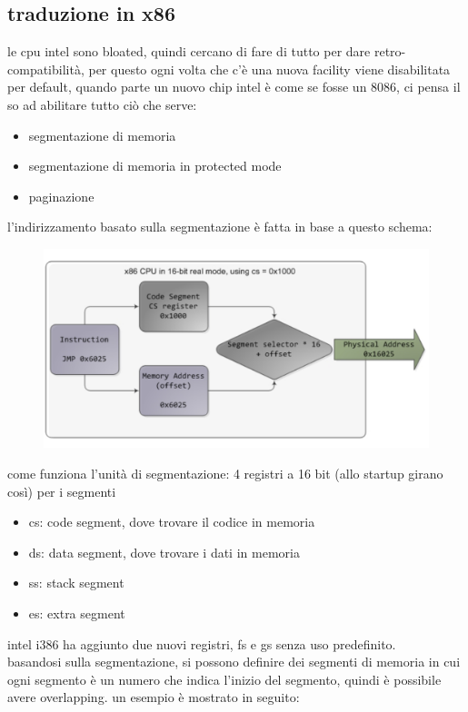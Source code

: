 \documentclass[12pt, oneside]{extbook} %
\begin{document}
\subsection{traduzione in x86}
le cpu intel sono bloated, quindi cercano di fare di tutto per dare retro-compatibilità, per questo ogni volta che c'è una nuova facility viene disabilitata per default, quando parte un nuovo chip intel è come se fosse un 8086, ci pensa il so ad abilitare tutto ciò che serve:
\begin{itemize}
\item segmentazione di memoria
\item segmentazione di memoria in protected mode
\item paginazione
\end{itemize}
l'indirizzamento basato sulla segmentazione è fatta in base a questo schema:
\begin{figure}[!h]
	\includegraphics[scale=0.3]{immagini/seg_based_transl.png}
\end{figure}
come funziona l'unità di segmentazione: 4 registri a 16 bit (allo startup girano così) per i segmenti
\begin{itemize}
\item cs: code segment, dove trovare il codice in memoria
\item ds: data segment, dove trovare i dati in memoria
\item ss: stack segment
\item es: extra segment
\end{itemize}
intel i386 ha aggiunto due nuovi registri, fs e gs senza uso predefinito.\\ basandosi sulla segmentazione, si possono definire dei segmenti di memoria in cui ogni segmento è un numero che indica l'inizio del segmento, quindi è possibile avere overlapping. un esempio è mostrato in seguito:
\end{document}
